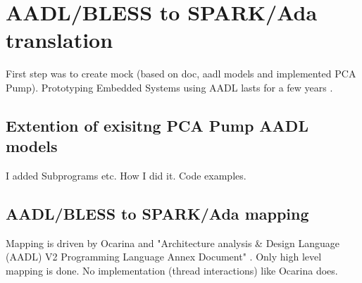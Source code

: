 
\cleardoublepage


\chapter{AADL/BLESS to SPARK/Ada translation}
\label{codegen}

First step was to create mock (based on doc, aadl models and implemented PCA Pump).
Prototyping Embedded Systems using AADL lasts for a few years \cite{PrototypyingAadl:Paper}.


\section{Extention of exisitng PCA Pump AADL models}
\label{codegen:existing-models}
I added Subprograms etc.
How I did it. Code examples.

\section{AADL/BLESS to SPARK/Ada mapping}
\label{codegen:mapping}
Mapping is driven by Ocarina and "Architecture analysis \& Design Language (AADL) V2 Programming Language Annex Document" \cite{AnnexDoc13}.
Only high level mapping is done. No implementation (thread interactions) like Ocarina does. 


